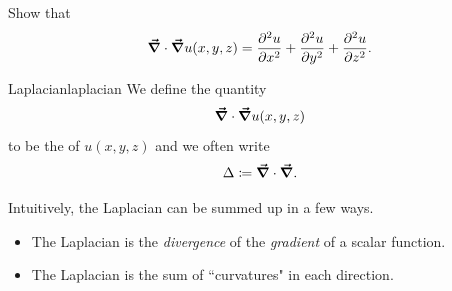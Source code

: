                \begin{exercise}
               Show that
               \[
               \boldsymbol{\vec{\nabla}} \cdot \boldsymbol{\vec{\nabla}} u(x,y,z) = \frac{\partial^2 u}{\partial x^2} + \frac{\partial^2 u}{\partial y^2} + \frac{\partial^2 u}{\partial z^2}.
               \]
               \end{exercise}

               \begin{df}{Laplacian}{laplacian}
               We define the quantity
               \[
               \boldsymbol{\vec{\nabla}} \cdot \boldsymbol{\vec{\nabla}} u(x,y,z)
               \]
               to be the  of $u(x,y,z)$ and we often write
               \[
               \Delta \coloneqq \boldsymbol{\vec{\nabla}} \cdot \boldsymbol{\vec{\nabla}}.
               \]

               \end{df}

               Intuitively, the Laplacian can be summed up in a few ways.
               \begin{itemize}
                   \item The Laplacian is the \emph{divergence} of the \emph{gradient} of a scalar function.
                   \item The Laplacian is the sum of ``curvatures" in each direction.
               \end{itemize}

